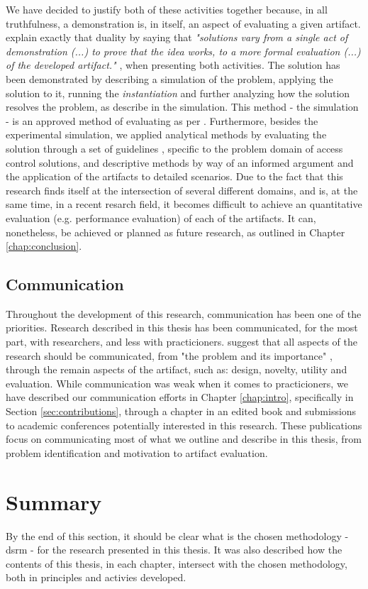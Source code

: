 We have decided to justify both of these activities together because, in all truthfulness, a demonstration is, in itself, an aspect of evaluating a given artifact. \citeauthor{peffers_design_2007} explain exactly that duality by saying that \textit{"solutions vary from a single act of demonstration (...) to prove that the idea works, to a more formal evaluation (...) of the developed artifact."} \cite[13]{peffers_design_2007}, when presenting both activities. The solution has been demonstrated by describing a simulation of the problem, applying the solution to it, running the \textit{instantiation} and further analyzing how the solution resolves the problem, as describe in the simulation. This method - the simulation - is an approved method of evaluating as per \citeauthor{hevner_design_2004} \cite[13]{hevner_design_2004}. Furthermore, besides the experimental simulation, we applied analytical methods by evaluating the solution through a set of guidelines \cite{hu_guidelines_2012}, specific to the problem domain of access control solutions, and descriptive methods by way of an informed argument and the application of the artifacts to detailed scenarios. Due to the fact that this research finds itself at the intersection of several different domains, and is, at the same time, in a recent resarch field, it becomes difficult to achieve an quantitative evaluation (e.g. performance evaluation) of each of the artifacts. It can, nonetheless, be achieved or planned as future research, as outlined in Chapter \ref{chap:conclusion}.

\subsection{Communication}

Throughout the development of this research, communication has been one of the priorities. Research described in this thesis has been communicated, for the most part, with researchers, and less with practicioners. \citeauthor{peffers_design_2007} suggest that all aspects of the research should be communicated, from "the problem and its importance" \cite[14]{peffers_design_2007}, through the remain aspects of the artifact, such as: design, novelty, utility and evaluation. While communication was weak when it comes to practicioners, we have described our communication efforts in Chapter \ref{chap:intro}, specifically in Section \ref{sec:contributions}, through a chapter in an edited book \cite{bryan_christiansen_access_2018} and submissions to academic conferences potentially interested in this research. These publications focus on communicating most of what we outline and describe in this thesis, from problem identification and motivation to artifact evaluation.

\section{Summary}

By the end of this section, it should be clear what is the chosen methodology - \glsdesc{dsrm} - for the research presented in this thesis. It was also described how the contents of this thesis, in each chapter, intersect with the chosen methodology, both in principles and activies developed.
